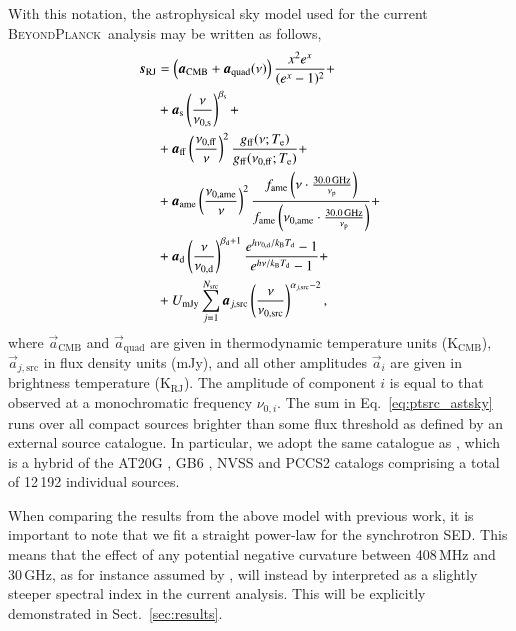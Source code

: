 \documentclass[twocolumn]{aa}
\newcommand{\BP}{\textsc{BeyondPlanck}}
\begin{document}
With this notation, the astrophysical sky model used for the current \BP\ analysis may be written as follows,
\begin{align}
  \vec{s}_{\mathrm{RJ}} &= \left(\vec{a}_{\mathrm{CMB}}+\vec{a}_{\mathrm{quad}}(\nu)\right) \frac{x^2 e^x}{(e^x -1)^2}+\label{eq:cmb_astsky}\\
  &+ \vec{a}_{\mathrm{s}} \left(\frac{\nu}{\nuzeros}\right)^{\bsynch} + \label{eq:synch_astsky}\\
  &+ \vec{a}_{\mathrm{ff}} \left(\frac{\nuzeroff}{\nu}\right)^2 \frac{g_{\mathrm{ff}}(\nu;\Te) }{g_{\mathrm{ff}}(\nuzeroff;\Te)} +\label{eq:ff_astsky}\\
  &+ \vec{a}_{\mathrm{ame}} \left(\frac{\nuzeroame}{\nu}\right)^2 \frac{f_{\mathrm{ame}} \left(\nu\cdot \frac{30.0\GHz}{\nup}\right)}{f_{\mathrm{ame}} \left(\nuzeroame\cdot \frac{30.0\GHz}{\nup}\right)}+ \label{eq:ame_astsky}\\
  &+ \vec{a}_{\mathrm{d}} \left(\frac{\nu}{\nuzerod}\right)^{\bdust+1} \frac{e^{h\nuzerod/\kB\Tdust}-1}{e^{h\nu/\kB\Tdust}-1}+ \label{eq:dust_astsky}\\
  &+ U_{\mathrm{mJy}} \sum_{j=1}^{N_{\mathrm{src}}} \vec{a}_{j,\mathrm{src}} \left(\frac{\nu}{\nuzerosrc}\right)^{\alpha_{j,\mathrm{src}}-2}, \label{eq:ptsrc_astsky}
\end{align}
where $\vec{a}_{\mathrm{CMB}}$ and $\vec{a}_{\mathrm{quad}}$ are given
in thermodynamic temperature units ($\mathrm{K_{CMB}}$),
$\vec{a}_{j,\mathrm{src}}$ in flux density units (mJy),
and all other amplitudes $\vec{a}_i$ are given in brightness
temperature ($\mathrm{K_{RJ}}$). The amplitude
of component $i$ is equal to that observed at a monochromatic
frequency $\nu_{0,i}$. The sum in Eq.~\eqref{eq:ptsrc_astsky} runs over
all compact sources brighter than some flux threshold as defined by an
external source catalogue. In particular, we adopt the same catalogue
as \citet{planck2016-l04}, which is a hybrid of the AT20G
\citep{murphy2010}, GB6 \citep{gregory1996}, NVSS \citep{condon1998}
and PCCS2 \citep{planck2014-a35} catalogs comprising a total of
12\,192 individual sources.

When comparing the results from the above model with previous work, it
is important to note that we fit a straight power-law for the
synchrotron SED. This means that the effect of any potential negative
curvature between 408\,MHz and 30\,GHz, as for instance assumed by
\citet{planck2014-a12}, will instead by interpreted as a slightly
steeper spectral index in the current analysis. This will be
explicitly demonstrated in Sect.~\ref{sec:results}.
\end{document}
